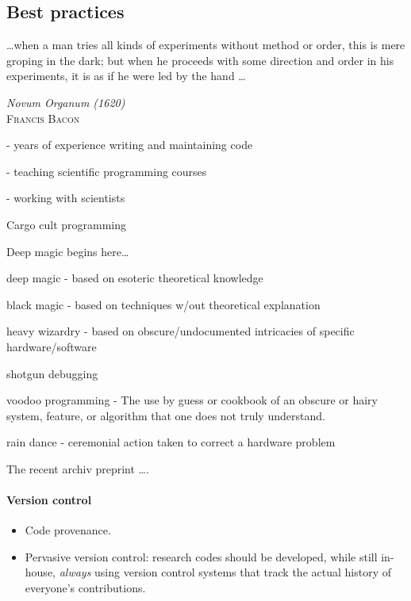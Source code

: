 \documentclass[ChapterTOCs,krantz2]{krantz} %
\begin{document}
\subsection{Best practices}

\setlength{\epigraphrule}{0pt}
\setlength{\epigraphwidth}{.65\textwidth}
\epigraph%
{%
  \ldots when a man tries all kinds of experiments without method or
  order, this is mere groping in the dark; but when he proceeds with
  some direction and order in his experiments, it is as if he were
  led by the hand \ldots
}%
{\textit{Novum Organum (1620)}\\ \textsc{Francis Bacon} }


- years of experience writing and maintaining code

- teaching scientific programming courses

- working with scientists

Cargo cult programming

Deep magic begins here\ldots

  deep magic - based on esoteric theoretical knowledge
  
  black magic - based on techniques w/out theoretical explanation
  
  heavy wizardry - based on obscure/undocumented intricacies of specific 
                  hardware/software
  
  shotgun debugging
  
  voodoo programming -  The use by guess or cookbook of an
  obscure or hairy system, feature, or algorithm that one does not truly
  understand.

  rain dance - ceremonial action taken to correct a hardware problem

The recent archiv preprint \ldots \cite{2012arXiv1210.0530A}.
\paragraph{ {\bf Version control}}

\begin{itemize}

\item Code provenance.

\item Pervasive version control: research codes should be developed, while
still in-house, \emph{always} using version control systems that track
the actual history of everyone's contributions.

\end{itemize}
\end{document}
